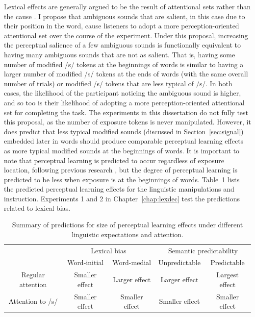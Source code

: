Lexical effects are generally argued to be the result of attentional sets rather than the cause \citep{Cutler1987, Pitt2012}.
I propose that ambiguous sounds that are salient, in this case due to their position in the word, cause listeners to adopt a more perception-oriented attentional set over the course of the experiment.
Under this proposal, increasing the perceptual salience of a few ambiguous sounds is functionally equivalent to having many ambiguous sounds that are not as salient.
That is, having some number of modified /s/ tokens at the beginnings of words is similar to having a larger number of modified /s/ tokens at the ends of words (with the same overall number of trials) or modified /s/ tokens that are less typical of /s/.
In both cases, the likelihood of the participant noticing the ambiguous sound is higher, and so too is their likelihood of adopting a more perception-oriented attentional set for completing the task.
The experiments in this dissertation do not fully test this proposal, as the number of exposure tokens is never manipulated.
However, it does predict that less typical modified sounds (discussed in Section~\ref{sec:signal}) embedded later in words should produce comparable perceptual learning effects as more typical modified sounds at the beginnings of words.
It is important to note that perceptual learning is predicted to occur regardless of exposure location, following previous research \citep{Norris2003,Kraljic2005, Kraljic2008a, Kraljic2008,Clare2014}, but the degree of perceptual learning is predicted to be less when exposure is at the beginnings of words.
Table~\ref{tbl:predictions} lists the predicted perceptual learning effects for the linguistic manipulations and instruction.
Experiments 1 and 2  in Chapter~\ref{chap:lexdec} test the predictions related to lexical bias.

\begin{table}[!ht]
\caption{Summary of predictions for size of perceptual learning effects under different linguistic expectations and attention.}
\label{tbl:predictions}
\centering
\small
\begin{tabular}{cccccc}
\toprule
                  &                   & \multicolumn{2}{c}{Lexical bias} & \multicolumn{2}{c}{Semantic predictability} \\
\cmidrule(r){3-4}
\cmidrule(r){5-6}
                  &                   & Word-initial    & Word-medial    & Unpredictable        & Predictable          \\
\midrule
\multicolumn{2}{c}{Regular attention} & Smaller effect  & Larger effect  & Larger effect       & Largest effect        \\
\multicolumn{2}{c}{Attention to /s/}  & Smaller effect  & Smaller effect & Smaller effect       & Smaller effect  \\
\bottomrule    
\end{tabular}
\end{table}

